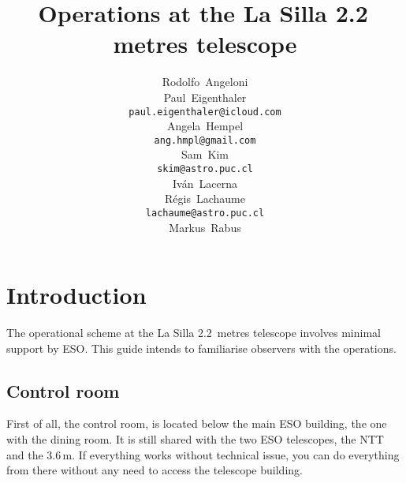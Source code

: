 \documentclass[11pt,fleqn,a4paper]{book}
\begin{document}
%
% 

\title{Operations at the La Silla 2.2\,metres telescope}%
\author{
    Rodolfo~Angeloni\\[5pt]
    Paul~Eigenthaler\\
    \texttt{paul.eigenthaler@icloud.com}\\[5pt]
    Angela~Hempel\\
    \texttt{ang.hmpl@gmail.com}\\[5pt]
    Sam~Kim\\
    \texttt{skim@astro.puc.cl}\\[5pt]
    Iv\'an~Lacerna\\[5pt]
    R\'egis~Lachaume\\
    \texttt{lachaume@astro.puc.cl}\\[5pt]
    Markus~Rabus}%
%
\version{\today}
\maketitle

%
% 

\tableofcontents 
\cleardoublepage 

\listoffigures 
\cleardoublepage 

\listoftables
\cleardoublepage 

\listofprocedures
\cleardoublepage

%
%

\chapter{Introduction}
The operational scheme at the La Silla 2.2~metres telescope involves minimal support by ESO.  This guide intends to familiarise observers with the operations. 

\section{Control room}

First of all, the \gls{control room}, is located below the main ESO building, the one with the dining room.  It is still shared with the two ESO telescopes, the NTT and the 3.6\,m. If everything works without technical issue, you can do everything from there without any need to access the telescope building.
\end{document}
